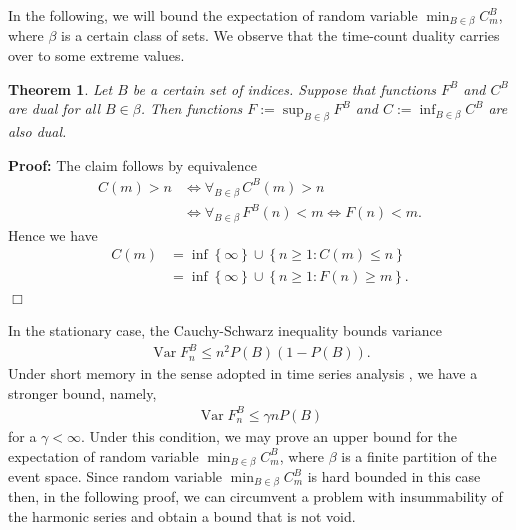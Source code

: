 \documentclass[a4paper,12pt]{article}
\newcommand{\klam}[1]{\left\{ #1 \right\}}
\DeclareMathOperator{\var}{Var}
\newtheorem{theorem}{Theorem}
\newenvironment*{proof}{\begin{trivlist}\item[]
\noindent\textbf{Proof:}}{$\Box$\par\end{trivlist}}
\begin{document}
In the following, we will bound the expectation of random variable
$\min_{B\in\beta} C^B_m$, where $\beta$ is a certain class of sets.
We observe that the time-count duality carries over to some extreme
values.
\begin{theorem}
  \label{theoExtreme}
  Let $B$ be a certain set of indices.  Suppose that functions $F^B$
  and $C^B$ are dual for all $B\in\beta$. Then functions
  $F:=\sup_{B\in\beta} F^B$ and $C:=\inf_{B\in\beta} C^B$ are also
  dual.
\end{theorem}
\begin{proof}
  The claim follows by equivalence
  \begin{align}
    C(m)>n
    &\iff\forall_{B\in\beta}\,C^B(m)>n
      \nonumber\\
    &\iff
      \forall_{B\in\beta}\,F^B(n)<m
      \iff F(n)<m.
  \end{align}
  Hence we have
  \begin{align}
    C(m)&=\inf\klam{\infty}\cup\klam{n\ge 1: C(m)\le n}
          \nonumber\\
        &=\inf\klam{\infty}\cup\klam{n\ge 1: F(n)\ge m}.
  \end{align}
\end{proof}

In the stationary case, the Cauchy-Schwarz inequality bounds variance
\begin{align}
 \var F^B_n\le n^2P(B)(1-P(B)).
\end{align}
Under short memory in the sense adopted in time series analysis
\citep{Beran94}, we have a stronger bound, namely,
\begin{align}
  \var F^B_n\le\gamma nP(B)
\end{align}
for a $\gamma<\infty$.  Under this condition, we may prove an upper
bound for the expectation of random variable $\min_{B\in\beta} C^B_m$,
where $\beta$ is a finite partition of the event space. Since random
variable $\min_{B\in\beta} C^B_m$ is hard bounded in this case then,
in the following proof, we can circumvent a problem with insummability
of the harmonic series and obtain a bound that is not void.
\end{document}
